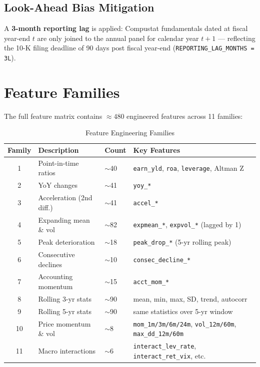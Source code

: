 \documentclass{report}\usepackage[]{graphicx}\usepackage[table]{xcolor}
\begin{document}
\subsection{Look-Ahead Bias Mitigation}

A \textbf{3-month reporting lag} is applied: Compustat fundamentals dated at fiscal 
year-end $t$ are only joined to the annual panel for calendar year $t+1$ — 
reflecting the 10-K filing deadline of 90 days post fiscal year-end 
(\texttt{REPORTING\_LAG\_MONTHS = 3L}).

\section{Feature Families}

The full feature matrix contains $\approx 480$ engineered features across 11 families:

\begin{table}[H]
\centering
\caption{Feature Engineering Families}
\begin{tabular}{clll}
\toprule
\textbf{Family} & \textbf{Description} & \textbf{Count} & \textbf{Key Features} \\
\midrule
1 & Point-in-time ratios & $\sim$40 & \texttt{earn\_yld}, \texttt{roa}, \texttt{leverage}, Altman Z \\
2 & YoY changes & $\sim$41 & \texttt{yoy\_*} \\
3 & Acceleration (2nd diff.) & $\sim$41 & \texttt{accel\_*} \\
4 & Expanding mean \& vol & $\sim$82 & \texttt{expmean\_*}, \texttt{expvol\_*} (lagged by 1) \\
5 & Peak deterioration & $\sim$18 & \texttt{peak\_drop\_*} (5-yr rolling peak) \\
6 & Consecutive declines & $\sim$10 & \texttt{consec\_decline\_*} \\
7 & Accounting momentum & $\sim$15 & \texttt{acct\_mom\_*} \\
8 & Rolling 3-yr stats & $\sim$90 & mean, min, max, SD, trend, autocorr \\
9 & Rolling 5-yr stats & $\sim$90 & same statistics over 5-yr window \\
10 & Price momentum \& vol & $\sim$8 & \texttt{mom\_1m/3m/6m/24m}, \texttt{vol\_12m/60m}, \texttt{max\_dd\_12m/60m} \\
11 & Macro interactions & $\sim$6 & \texttt{interact\_lev\_rate}, \texttt{interact\_ret\_vix}, etc. \\
\bottomrule
\end{tabular}
\end{table}
\end{document}
